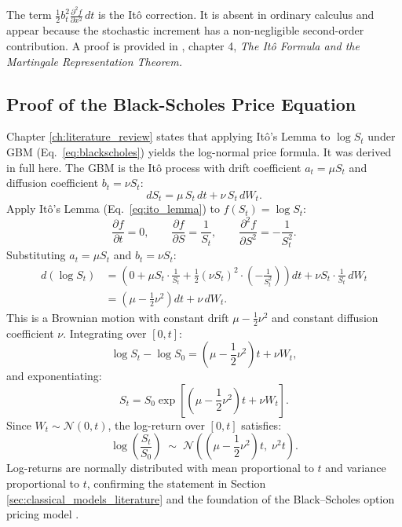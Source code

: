 The term $\frac{1}{2} b_t^2 \frac{\partial^2 f}{\partial x^2}\, dt$ is the
It\^{o} correction. It is absent in ordinary calculus and appear
because the stochastic increment has a non-negligible second-order contribution. A proof is provided in \cite{oksendal2003stochastic}, chapter 4, \emph{The Itô Formula and the Martingale Representation Theorem.}

\subsection{Proof of the Black-Scholes Price Equation}

Chapter \ref{ch:literature_review} states that applying It\^{o}'s Lemma to $\log S_t$ under GBM
(Eq.~\ref{eq:blackscholes}) yields the log-normal price formula. It was derived in full here. The GBM is the It\^{o} process with drift coefficient
$a_t = \mu S_t$ and diffusion coefficient $b_t = \nu S_t$:
\[
    dS_t = \mu\, S_t\, dt + \nu\, S_t\, dW_t.
\]
Apply It\^{o}'s Lemma (Eq.~\ref{eq:ito_lemma}) to $f(S_t) = \log S_t$:
\[
    \frac{\partial f}{\partial t} = 0, \qquad
    \frac{\partial f}{\partial S} = \frac{1}{S_t}, \qquad
    \frac{\partial^2 f}{\partial S^2} = -\frac{1}{S_t^2}.
\]
Substituting $a_t = \mu S_t$ and $b_t = \nu S_t$:
\begin{align*}
    d(\log S_t)
    &= \left(0 + \mu S_t \cdot \frac{1}{S_t}
       + \frac{1}{2}(\nu S_t)^2 \cdot \left(-\frac{1}{S_t^2}\right)\right)\! dt
       + \nu S_t \cdot \frac{1}{S_t}\, dW_t \\
    &= \left(\mu - \frac{1}{2}\nu^2\right)\! dt + \nu\, dW_t.
\end{align*}
This is a Brownian motion with constant drift $\mu - \frac{1}{2}\nu^2$ and
constant diffusion coefficient $\nu$. Integrating over $[0, t]$:
\[
    \log S_t - \log S_0
    = \left(\mu - \frac{1}{2}\nu^2\right)t + \nu W_t,
\]
and exponentiating:
\[
\label{eq:gbm_solution_app}
    S_t = S_0 \exp\!\left[\left(\mu - \frac{1}{2}\nu^2\right)t
          + \nu W_t\right].
\]
Since $W_t \sim \mathcal{N}(0, t)$, the log-return over $[0, t]$ satisfies:
\[
    \label{eq:lognormal_returns_app}
    \log\!\left(\frac{S_t}{S_0}\right)
    \;\sim\; \mathcal{N}\!\left(\left(\mu - \frac{1}{2}\nu^2\right)t,\;
    \nu^2 t\right).
\]
Log-returns are normally distributed with mean proportional to $t$ and variance
proportional to $t$, confirming the statement in Section \ref{sec:classical_models_literature} and the foundation
of the Black--Scholes option pricing model \cite{black1973pricing}.

